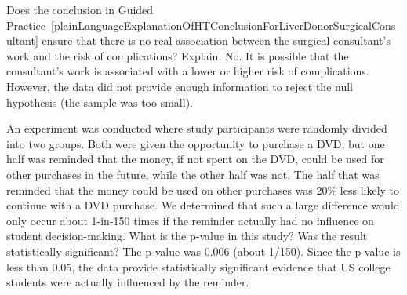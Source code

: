 \begin{examplewrap}
\begin{nexample}{Does the conclusion in Guided Practice~\ref{plainLanguageExplanationOfHTConclusionForLiverDonorSurgicalConsultant} ensure that there is no real association between the surgical consultant's work and the risk of complications? Explain.}
No. It is possible that the consultant's work is associated with a lower or higher risk of complications. However, the data did not provide enough information to reject the null hypothesis (the sample was too small).
\end{nexample}
\end{examplewrap}




\begin{examplewrap}
\begin{nexample}{An experiment was conducted where study participants were randomly divided into two groups. Both were given the opportunity to purchase a DVD, but one half was reminded that the money, if not spent on the DVD, could be used for other purchases in the future, while the other half was not. The half that was reminded that the money could be used on other purchases was 20\% less likely to continue with a DVD purchase. We determined that such a large difference would only occur about 1-in-150 times if the reminder actually had no influence on student decision-making. What is the p-value in this study? Was the result statistically significant?}
The p-value was 0.006 (about 1/150). Since the p-value is less than 0.05, the data provide statistically significant evidence that US college students were actually influenced by the reminder.
\end{nexample}
\end{examplewrap}

